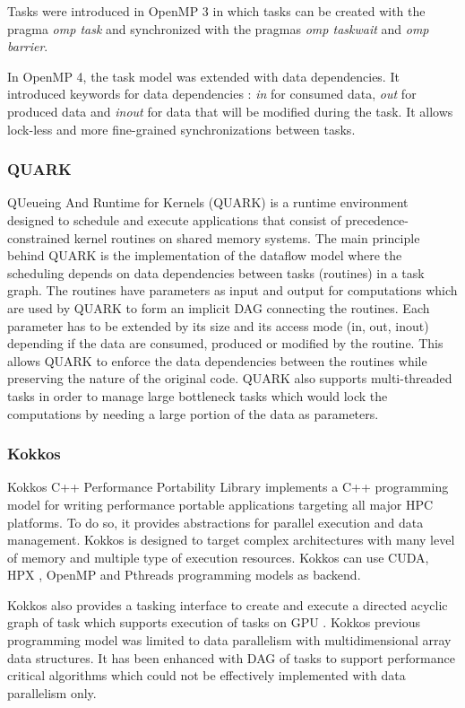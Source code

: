 Tasks were introduced in OpenMP 3 \cite{ACDHM2009} in which tasks can be created with the pragma \textit{omp task} and synchronized with the pragmas \textit{omp taskwait} and \textit{omp barrier}.

In OpenMP 4, the task model was extended with data dependencies.
It introduced keywords for data dependencies : \textit{in} for consumed data, \textit{out} for produced data and \textit{inout} for data that will be modified during the task.
It allows lock-less and more fine-grained synchronizations between tasks.

\subsubsection{QUARK}
QUeueing And Runtime for Kernels (QUARK) \cite{YarkKD2011} is a runtime environment designed to schedule and execute applications that consist of precedence-constrained kernel routines on shared memory systems.
The main principle behind QUARK is the implementation of the dataflow model where the scheduling depends on data dependencies between tasks (routines) in a task graph.
The routines have parameters as input and output for computations which are used by QUARK to form an implicit DAG connecting the routines.
Each parameter has to be extended by its size and its access mode (in, out, inout) depending if the data are consumed, produced or modified by the routine.
This allows QUARK to enforce the data dependencies between the routines while preserving the nature of the original code.
QUARK also supports multi-threaded tasks in order to manage large bottleneck tasks which would lock the computations by needing a large portion of the data as parameters.

\subsubsection{Kokkos}
Kokkos C++ Performance Portability Library \cite{CarTS2014} implements a C++ programming model for writing performance portable applications targeting all major HPC platforms.
To do so, it provides abstractions for parallel execution and data management.
Kokkos is designed to target complex architectures with many level of memory and multiple type of execution resources.
Kokkos can use CUDA, HPX \cite{KHASF2014}, OpenMP \cite{DaguM1998} and Pthreads programming models as backend.

Kokkos also provides a tasking interface to create and execute a directed acyclic graph of task which supports execution of tasks on GPU \cite{CartI2017}.
Kokkos previous programming model was limited to data parallelism with multidimensional array data structures.
It has been enhanced with DAG of tasks to support performance critical algorithms which could not be effectively implemented with data parallelism only.

